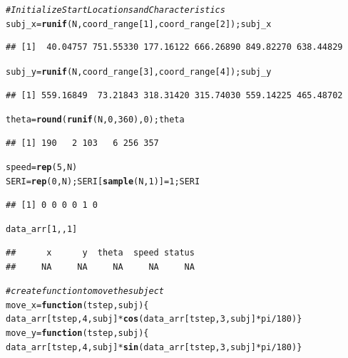\documentclass{article}\usepackage[]{graphicx}\usepackage[]{color}
\makeatletter
\newcommand{\hlnum}[1]{\textcolor[rgb]{0.686,0.059,0.569}{#1}}%
\newcommand{\hlcom}[1]{\textcolor[rgb]{0.678,0.584,0.686}{\textit{#1}}}%
\newcommand{\hlopt}[1]{\textcolor[rgb]{0,0,0}{#1}}%
\newcommand{\hlstd}[1]{\textcolor[rgb]{0.345,0.345,0.345}{#1}}%
\newcommand{\hlkwa}[1]{\textcolor[rgb]{0.161,0.373,0.58}{\textbf{#1}}}%
\newcommand{\hlkwb}[1]{\textcolor[rgb]{0.69,0.353,0.396}{#1}}%
\newcommand{\hlkwc}[1]{\textcolor[rgb]{0.333,0.667,0.333}{#1}}%
\newcommand{\hlkwd}[1]{\textcolor[rgb]{0.737,0.353,0.396}{\textbf{#1}}}%
\newenvironment{kframe}{%
 \def\at@end@of@kframe{}%
 \ifinner\ifhmode%
  \def\at@end@of@kframe{\end{minipage}}%
  \begin{minipage}{\columnwidth}%
 \fi\fi%
 \def\FrameCommand##1{\hskip\@totalleftmargin \hskip-\fboxsep
 \colorbox{shadecolor}{##1}\hskip-\fboxsep
     \hskip-\linewidth \hskip-\@totalleftmargin \hskip\columnwidth}%
 \MakeFramed {\advance\hsize-\width
   \@totalleftmargin\z@ \linewidth\hsize
   \@setminipage}}%
 {\par\unskip\endMakeFramed%
 \at@end@of@kframe}
\newenvironment{knitrout}{}{} %
\makeatother
\begin{document}
\begin{knitrout}
\begin{kframe}
{\ttfamily\noindent\bfseries\color{errorcolor}{\#\# Error in eval(expr, envir, enclos): object 's' not found}}\begin{alltt}
\hlcom{# Initialize Start Locations and Characteristics}
\hlstd{subj_x} \hlkwb{=} \hlkwd{runif}\hlstd{(N, coord_range[}\hlnum{1}\hlstd{],  coord_range[}\hlnum{2}\hlstd{]); subj_x}
\end{alltt}
\begin{verbatim}
## [1]  40.04757 751.55330 177.16122 666.26890 849.82270 638.44829
\end{verbatim}
\begin{alltt}
\hlstd{subj_y} \hlkwb{=} \hlkwd{runif}\hlstd{(N, coord_range[}\hlnum{3}\hlstd{],  coord_range[}\hlnum{4}\hlstd{]); subj_y}
\end{alltt}
\begin{verbatim}
## [1] 559.16849  73.21843 318.31420 315.74030 559.14225 465.48702
\end{verbatim}
\begin{alltt}
\hlstd{theta} \hlkwb{=} \hlkwd{round}\hlstd{(}\hlkwd{runif}\hlstd{(N,} \hlnum{0}\hlstd{,} \hlnum{360}\hlstd{),}\hlnum{0}\hlstd{); theta}
\end{alltt}
\begin{verbatim}
## [1] 190   2 103   6 256 357
\end{verbatim}
\begin{alltt}
\hlstd{speed} \hlkwb{=} \hlkwd{rep}\hlstd{(}\hlnum{5}\hlstd{,N)}
\hlstd{SERI} \hlkwb{=} \hlkwd{rep}\hlstd{(}\hlnum{0}\hlstd{, N); SERI[}\hlkwd{sample}\hlstd{(N,} \hlnum{1}\hlstd{)]} \hlkwb{=} \hlnum{1}\hlstd{; SERI}
\end{alltt}
\begin{verbatim}
## [1] 0 0 0 0 1 0
\end{verbatim}
\begin{alltt}
\hlstd{data_arr[}\hlnum{1}\hlstd{,,}\hlnum{1}\hlstd{]}
\end{alltt}
\begin{verbatim}
##      x      y  theta  speed status 
##     NA     NA     NA     NA     NA
\end{verbatim}
\begin{alltt}
\hlcom{#create function to move the subject}
\hlstd{move_x} \hlkwb{=} \hlkwa{function}\hlstd{(}\hlkwc{tstep}\hlstd{,} \hlkwc{subj}\hlstd{)\{}
\hlstd{data_arr[tstep,} \hlnum{4}\hlstd{, subj]} \hlopt{*} \hlkwd{cos}\hlstd{(data_arr[tstep,}\hlnum{3}\hlstd{, subj]}\hlopt{*}\hlstd{pi}\hlopt{/}\hlnum{180}\hlstd{)\}}
\hlstd{move_y} \hlkwb{=} \hlkwa{function}\hlstd{(}\hlkwc{tstep}\hlstd{,} \hlkwc{subj}\hlstd{)\{}
\hlstd{data_arr[tstep,} \hlnum{4}\hlstd{, subj]} \hlopt{*} \hlkwd{sin}\hlstd{(data_arr[tstep,}\hlnum{3}\hlstd{, subj]}\hlopt{*}\hlstd{pi}\hlopt{/}\hlnum{180}\hlstd{)\}}


\end{alltt}
\end{kframe}
\end{knitrout}
\end{document}
